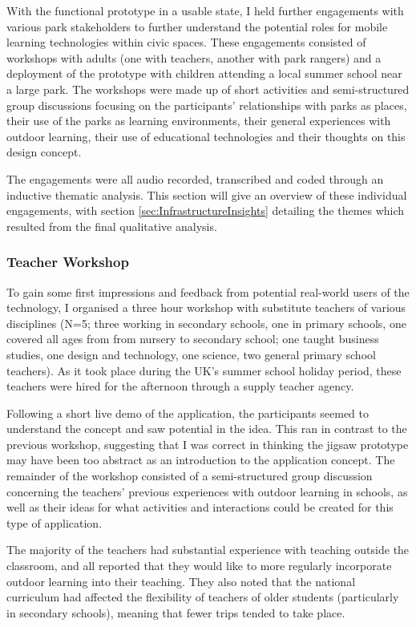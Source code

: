 With the functional prototype in a usable state, I held further engagements with various park stakeholders to further understand the potential roles for mobile learning technologies within civic spaces. These engagements consisted of workshops with adults (one with teachers, another with park rangers) and a deployment of the prototype with children attending a local summer school near a large park. The workshops were made up of short activities and semi-structured group discussions focusing on the participants’ relationships with parks as places, their use of the parks as learning environments, their general experiences with outdoor learning, their use of educational technologies and their thoughts on this design concept.

The engagements were all audio recorded, transcribed and coded through an inductive thematic analysis. This section will give an overview of these individual engagements, with section \ref{sec:InfrastructureInsights} detailing the themes which resulted from the final qualitative analysis.  

\subsubsection{Teacher Workshop}

To gain some first impressions and feedback from potential real-world users of the technology, I organised a three hour workshop with substitute teachers of various disciplines (N=5; three working in secondary schools, one in primary schools, one covered all ages from from nursery to secondary school; one taught business studies, one design and technology, one science, two general primary school teachers). As it took place during the UK's summer school holiday period, these teachers were hired for the afternoon through a supply teacher agency. 

Following a short live demo of the application, the participants seemed to understand the concept and saw potential in the idea. This ran in contrast to the previous workshop, suggesting that I was correct in thinking the jigsaw prototype may have been too abstract as an introduction to the application concept. The remainder of the workshop consisted of a semi-structured group discussion concerning the teachers' previous experiences with outdoor learning in schools, as well as their ideas for what activities and interactions could be created for this type of application.

The majority of the teachers had substantial experience with teaching outside the classroom, and all reported that they would like to more regularly incorporate outdoor learning into their teaching. They also noted that the national curriculum had affected the flexibility of teachers of older students (particularly in secondary schools), meaning that fewer trips tended to take place. 

